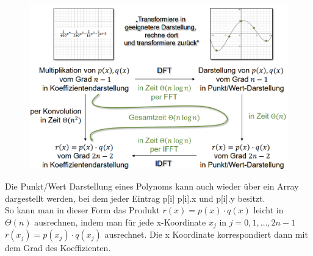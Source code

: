 \documentclass[
../../AuD-Zusammenfassung.tex,
]
{subfiles}
\begin{document}
\begin{figure}[htp]
    \centering
    \includegraphics[scale = 0.6]{Pics/FourierTransPolySchema.png}
\end{figure}
Die Punkt/Wert Darstellung eines Polynoms kann auch wieder über ein Array dargestellt werden, bei dem jeder Eintrag p[i] p[i].x und p[i].y besitzt. \\
So kann man in dieser Form das Produkt $r(x) = p(x) \cdot q(x)$ leicht in $\Theta(n)$ ausrechnen, indem man für jede x-Koordinate $x_j$ in $j = 0, 1, \ldots, 2n -1$ $r(x_j) = p(x_j) \cdot q(x_j)$ ausrechnet. Die x Koordinate korrespondiert dann mit dem Grad des Koeffizienten.\\
\begin{algorithm}[H]
\end{algorithm}
\end{document}

